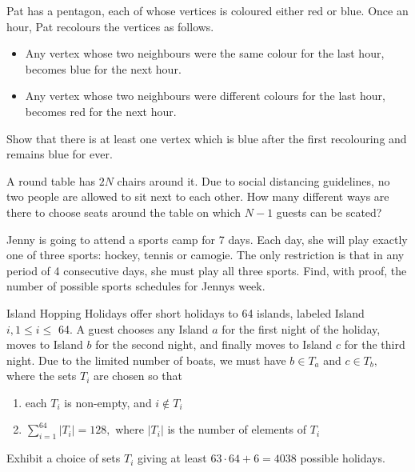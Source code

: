\documentclass{pset}
\begin{document}
\begin{problems}


\begin{problem}[IrMO 2020 Q6]
    Pat has a pentagon, each of whose vertices is coloured either red or blue. Once an hour, Pat recolours the vertices as follows.
    \begin{itemize}
        \item Any vertex whose two neighbours were the same colour for the last hour, becomes blue for the next hour.
        \item Any vertex whose two neighbours were different colours for the last hour, becomes red for the next hour.
    \end{itemize}
Show that there is at least one vertex which is blue after the first recolouring and remains blue for ever.
\end{problem}

\begin{problem}[IrMO 2020 Q2]
    A round table has $2 N$ chairs around it. Due to social distancing guidelines, no two people are allowed to sit next to each other. How many different ways are there to choose seats around the table on which $N-1$ guests can be scated?
\end{problem}

\begin{problem}[IrMO 2019 Q2]
    Jenny is going to attend a sports camp for 7 days. Each day, she will play exactly one of three sports: hockey, tennis or camogie. The only restriction is that in any period of 4 consecutive days, she must play all three sports.
    Find, with proof, the number of possible sports schedules for Jennys week.
\end{problem}

\begin{problem}[IrMO 2019 Q10]
    Island Hopping Holidays offer short holidays to 64 islands, labeled Island \(i, 1 \leq i \leq\)
    64. A guest chooses any Island \(a\) for the first night of the holiday, moves to Island
    \(b\) for the second night, and finally moves to Island \(c\) for the third night. Due to the limited number of boats, we must have \(b \in T_{a}\) and \(c \in T_{b},\) where the sets \(T_{i}\) are chosen so that
    \begin{enumerate}
        \item each \(T_{i}\) is non-empty, and \(i \notin T_{i}\)
        \item \(\sum_{i=1}^{64}\left|T_{i}\right|=128,\) where \(\left|T_{i}\right|\) is the number of elements of \(T_{i}\)
    \end{enumerate}
    Exhibit a choice of sets \(T_{i}\) giving at least \(63 \cdot 64+6=4038\) possible holidays.
\end{problem}


\end{problems}
\end{document}
